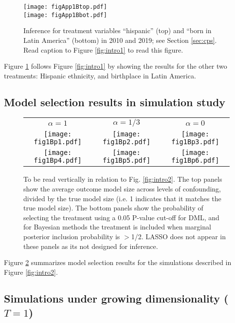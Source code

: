 \documentclass[12pt]{article}
\begin{document}
\begin{figure}[h]
\centering
\texttt{[image: figApp1Btop.pdf]}\\
\texttt{[image: figApp1Bbot.pdf]}
\caption{Inference for treatment variables ``hispanic'' (top) and ``born in Latin America'' (bottom) in 2010 and 2019; see Section \ref{sec:cps}. Read caption to Figure \ref{fig:intro1} to read this figure.}
\label{fig:figApp1B}
\end{figure}

Figure \ref{fig:figApp1B} follows Figure \ref{fig:intro1} by showing the results for the other two treatments: Hispanic ethnicity, and birthplace in Latin America.


\subsection{Model selection results in simulation study}

\begin{figure}[h]
\centering
\begin{tabular}{ccc}
$\alpha = 1$ & $\alpha = 1/3$ & $\alpha = 0$ \\
\texttt{[image: fig1Bp1.pdf]} &
\texttt{[image: fig1Bp2.pdf]} &
\texttt{[image: fig1Bp3.pdf]} \\
\texttt{[image: fig1Bp4.pdf]} &
\texttt{[image: fig1Bp5.pdf]} &
\texttt{[image: fig1Bp6.pdf]}
\end{tabular}
\caption{To be read vertically in relation to Fig. \ref{fig:intro2}. The top panels show the average outcome model size across levels of confounding, divided by the true model size (i.e. 1 indicates that it matches the true model size). The bottom panels show the probability of selecting the treatment using a 0.05 P-value cut-off for DML, and for Bayesian methods the treatment is included when marginal posterior inclusion probability is $>$1/2. LASSO does not appear in these panels as its not designed for inference.}
\label{fig:fig1b}
\end{figure}

Figure \ref{fig:fig1b} summarizes model selection results for the simulations described in Figure \ref{fig:intro2}.


\subsection{Simulations under growing dimensionality ($T=1$)}
\end{document}
